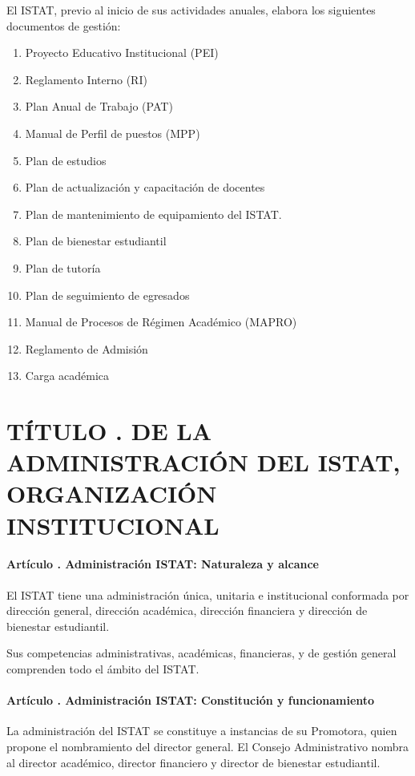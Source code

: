 El ISTAT, previo al inicio de sus actividades anuales, elabora los siguientes documentos de gestión: 
\begin{enumerate}
\item Proyecto Educativo Institucional (PEI) 
\item Reglamento Interno (RI) 
\item Plan Anual de Trabajo (PAT) 
\item Manual de Perfil de puestos (MPP) 
\item Plan de estudios 
\item Plan de actualización y capacitación de docentes 
\item Plan de mantenimiento de equipamiento del ISTAT. 
\item Plan de bienestar estudiantil 
\item Plan de tutoría  
\item Plan de seguimiento de egresados 
\item Manual de Procesos de Régimen Académico (MAPRO) 
\item Reglamento de Admisión 
\item Carga académica
\end{enumerate}
\part{TÍTULO . DE LA ADMINISTRACIÓN DEL ISTAT, ORGANIZACIÓN INSTITUCIONAL}
\addtocounter{ns}{1}
\subsection{Artículo . Administración ISTAT: Naturaleza y alcance}
\addtocounter{ns}{1}
El ISTAT tiene una administración única, unitaria e institucional conformada por dirección general, dirección académica, dirección financiera y dirección de bienestar estudiantil. 
 
Sus competencias administrativas, académicas, financieras, y de gestión general comprenden todo el ámbito del ISTAT.  
\subsection{Artículo . Administración ISTAT: Constitución y funcionamiento}
\addtocounter{ns}{1}
La administración del ISTAT se constituye a instancias de su Promotora, quien propone el nombramiento del director general. El Consejo Administrativo nombra al director académico, director financiero y director de bienestar estudiantil. 
